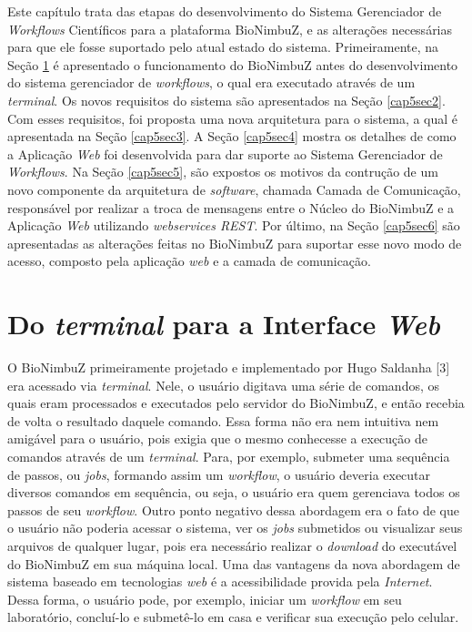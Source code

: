 Este capítulo trata das etapas do desenvolvimento do Sistema Gerenciador de \textit{Workflows} Científicos para a plataforma BioNimbuZ, e as alterações necessárias para que ele fosse suportado pelo atual estado do sistema. Primeiramente, na Seção \ref{cap5sec1} é apresentado o funcionamento do BioNimbuZ antes do desenvolvimento do sistema gerenciador de \textit{workflows}, o qual era executado através de um \textit{terminal}. Os novos requisitos do sistema são apresentados na Seção \ref{cap5sec2}. Com esses requisitos, foi proposta uma nova arquitetura para o sistema, a qual é apresentada na Seção \ref{cap5sec3}. A Seção \ref{cap5sec4} mostra os detalhes de como a Aplicação \textit{Web} foi desenvolvida para dar suporte ao Sistema Gerenciador de \textit{Workflows}. Na Seção \ref{cap5sec5}, são expostos os motivos da contrução de um novo componente da arquitetura de \textit{software}, chamada Camada de Comunicação, responsável por realizar a troca de mensagens entre o Núcleo do BioNimbuZ e a Aplicação \textit{Web} utilizando \textit{webservices REST}. Por último, na Seção \ref{cap5sec6} são apresentadas as alterações feitas no BioNimbuZ para suportar esse novo modo de acesso, composto pela aplicação \textit{web} e a camada de comunicação.

\section{Do \textit{terminal} para a Interface \textit{Web}} \label{cap5sec1}

O BioNimbuZ primeiramente projetado e implementado por Hugo Saldanha [3] era acessado via \textit{terminal}. Nele, o usuário digitava uma série de comandos, os quais eram processados e executados pelo servidor do BioNimbuZ, e então recebia de volta o resultado daquele comando. Essa forma não era nem intuitiva nem amigável para o usuário, pois exigia que o mesmo conhecesse a execução de comandos através de um \textit{terminal}. Para, por exemplo, submeter uma sequência de passos, ou \textit{jobs}, formando assim um \textit{workflow}, o usuário deveria executar diversos comandos em sequência, ou seja, o usuário era quem gerenciava todos os passos de seu \textit{workflow}. Outro ponto negativo dessa abordagem era o fato de que o usuário não poderia acessar o sistema, ver os \textit{jobs} submetidos ou visualizar seus arquivos de qualquer lugar, pois era necessário realizar o \textit{download} do executável do BioNimbuZ em sua máquina local. Uma das vantagens da nova abordagem de sistema baseado em tecnologias \textit{web} é a acessibilidade provida pela \textit{Internet}. Dessa forma, o usuário pode, por exemplo, iniciar um \textit{workflow} em seu laboratório, concluí-lo e submetê-lo em casa e verificar sua execução pelo celular. 

